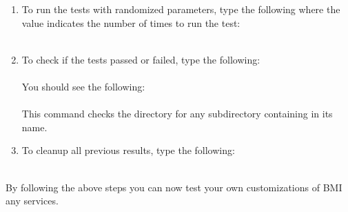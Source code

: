 \begin{enumerate}
\item To run the tests with randomized parameters, type the following where the value indicates the number of times to run the test: \\

 \\

\item To check if the tests passed or failed, type the following: \\

 \\

  You should see the following: \\
 
 \\

  This command checks the  directory for any subdirectory containing  in its name. \\
 
\item To cleanup all previous results, type the following: \\

 \\

\end{enumerate}

By following the above steps you can now test your own customizations of BMI any services.
